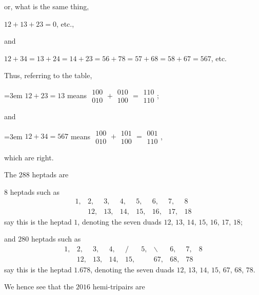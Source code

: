 \documentclass[11pt,a4paper]{book}
\begin{document}
or, what is the same thing,

$12 + 13 + 23 = 0$, etc.,

and

$12 + 34 = 13 + 24 = 14 + 23 = 56 + 78 = 57 + 68 = 58 + 67 = 567$, etc.

Thus, referring to the table,

\noindent\hangindent=3em $12 + 23 = 13$ means
$\begin{matrix} 100 \\ 010 \end{matrix} +
\begin{matrix} 010 \\ 100 \end{matrix} =
\begin{matrix} 110 \\ 110 \end{matrix}$;

\noindent and

\noindent\hangindent=3em $12 + 34 = 567$ means
$\begin{matrix} 100 \\ 010 \end{matrix} +
\begin{matrix} 101 \\ 100 \end{matrix} =
\begin{matrix} 001 \\ 110 \end{matrix}$,

\noindent which are right.

The $288$ heptads are

\noindent $8$ heptads such as
\[
\begin{matrix} 1, & 2, & 3, & 4, & 5, & 6, & 7, & 8 \\ & 12, & 13, & 14, & 15, & 16, & 17, & 18 \end{matrix}
\]
say this is the heptad $1$, denoting the seven duads $12$, $13$, $14$, $15$, $16$, $17$, $18$;

and $280$ heptads such as
\[
\begin{matrix} 1, & 2, & 3, & 4, & / & 5, & \backslash & 6, & 7, & 8 \\ & 12, & 13, & 14, & 15, & & 67, & 68, & 78 \end{matrix}
\]
say this is the heptad $1.678$, denoting the seven duads $12$, $13$, $14$, $15$, $67$, $68$, $78$.

We hence see that the $2016$ hemi-tripairs are
\end{document}
